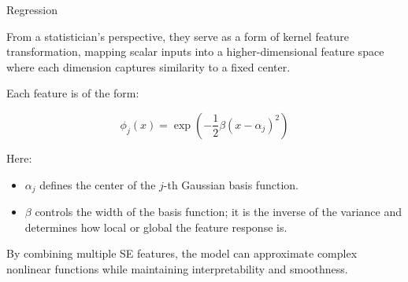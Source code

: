 \documentclass[
	english,
        solution=true
	]{tudaexercise}
\begin{document}
\begin{task}[points=34]{Regression}
\begin{subtask}[points=8, title=Squared Exponential Features]
\begin{solution}
            From a statistician’s perspective, they serve as a form of kernel feature transformation, mapping scalar inputs into a higher-dimensional feature space where each dimension captures similarity to a fixed center.

            Each feature is of the form:

            \[
            \phi_j(x) = \exp\left(-\frac{1}{2} \beta (x - \alpha_j)^2\right)
            \]

            Here:
            \begin{itemize}
                \item $\alpha_j$ defines the center of the $j$-th Gaussian basis function.
                \item $\beta$ controls the width of the basis function; it is the inverse of the variance and determines how local or global the feature response is.
            \end{itemize}

            By combining multiple SE features, the model can approximate complex nonlinear functions while maintaining interpretability and smoothness.

        \end{solution}
    \end{subtask}
\end{task}





\end{document}
